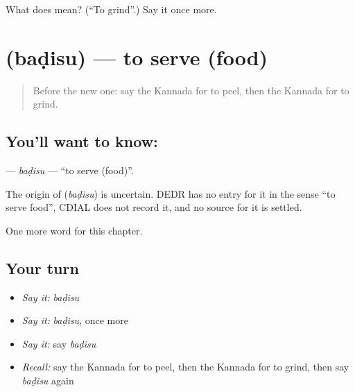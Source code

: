 \begin{tcolorbox}[breakable,colback=teal!4,colframe=teal!35!black,title={Before you move on}]
What does  mean? (\textquotedblleft{}To grind\textquotedblright{}.) Say it once more.
\end{tcolorbox}
\section[\texorpdfstring{\kn{ಬಡಿಸು} (baḍisu)}{ಬಡಿಸು (baḍisu)}]{ (baḍisu) — to serve (food)}

\label{lesson:KA-C159-badisu}



\begin{quote}
Before the new one: say the Kannada for to peel, then the Kannada for to grind.
\end{quote}

\subsection*{You'll want to know: }
\textbf{} — \emph{baḍisu} — \textquotedblleft{}to serve (food)\textquotedblright{}.

\begin{cousinweb}
The origin of \textbf{} (\emph{baḍisu}) is uncertain. DEDR has no entry for it in the sense \textquotedblleft{}to serve food\textquotedblright{}, CDIAL does not record it, and no source for it is settled.
\end{cousinweb}

\begin{grammarlens}[title={What you've built}]
One more word for this chapter.
\end{grammarlens}

\subsection*{Your turn}
\begin{itemize}
\raggedright
  \item \emph{Say it:} \emph{baḍisu}
  \item \emph{Say it:} \emph{baḍisu}, once more
  \item \emph{Say it:} say \emph{baḍisu}
  \item \emph{Recall:} say the Kannada for to peel, then the Kannada for to grind, then say \emph{baḍisu} again
\end{itemize}

